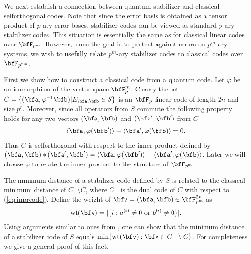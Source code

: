 \documentclass{article}
\def\wt{\qopname\relax{no}{wt}}
\begin{document}
We next establish a connection between quantum stabilizer and
classical selforthogonal codes.  Note that since the error basis is
obtained as a tensor product of $p$-ary error bases, stabilizer codes
can be viewed as standard $p$-ary stabilizer codes. This situation is
essentially the same as for classical linear codes over $\bfF_{p^m}$.
However, since the goal is to protect against errors on $p^m$-ary
systems, we wish to usefully relate $p^m$-ary stabilizer codes to
classical codes over $\bfF_{p^{2m}}$.

First we show how to construct a classical code from a quantum code. 
Let $\varphi$ be an isomorphism of the vector space $\bfF_p^m$.
Clearly the set $C=\{(\bfa, \varphi^{-1}\bfb)|
E_{\bfa,\bfb}\in S\}$ is an $\bfF_p$-linear code of length $2n$ and
size $p^r$.  Moreover, since all operators from $S$ commute the
following property holds for any two vectors $(\bfa,\bfb)$ and
$(\bfa',\bfb')$ from $C$
\begin{equation}\label{eq:inprcode} 
\langle  \bfa, \varphi(\bfb')\rangle-\langle \bfa',
\varphi(\bfb)\rangle=0.
\end{equation}
Thus $C$ is selforthogonal with respect to the inner product defined
by $(\bfa,\bfb)*(\bfa',\bfb')=\langle \bfa,
\varphi(\bfb')\rangle-\langle \bfa', \varphi(\bfb)\rangle$. Later we
will choose $\varphi$ to relate the inner product to the structure of
$\bfF_{p^m}$.

The minimum distance of a stabilizer code defined by $S$ is
related to the classical minimum distance of $C^\perp\setminus C$, where
$C^\perp$ is the dual code of $C$ with respect to
(\ref{eq:inprcode}).
Define the weight of $\bfv=(\bfa,\bfb)\in \bfF_{p^m}^{2n}$ as
$$
\wt(\bfv )=|\{i: a^{(i)}\not =0 \mbox{ or } b^{(i)}\not =0 \}|.
$$
Using arguments similar to ones from \cite{Calderbank97}, one can show that 
the minimum distance of a stabilizer code of $S$ equals
$\min\{\wt(\bfv):\bfv \in C^\perp\setminus C\}$. For completeness
we give a general proof of this fact.
\end{document}

